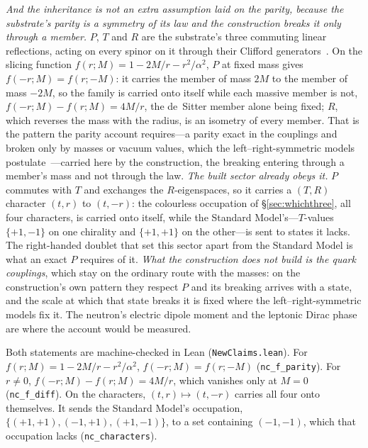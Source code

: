 \documentclass[11pt]{article}
\begin{document}
\emph{And the inheritance is not an extra assumption laid on the parity, because the substrate's parity is a symmetry of its law and the construction breaks it only through a member.} $P$, $T$ and $R$ are the substrate's three commuting linear reflections, acting on every spinor on it through their Clifford generators~\cite{JanzenBoundary}. On the slicing function $f(r;M)=1-2M/r-r^{2}/\alpha^{2}$, $P$ at fixed mass gives $f(-r;M)=f(r;-M)$: it carries the member of mass $2M$ to the member of mass $-2M$, so the family is carried onto itself while each massive member is not, $f(-r;M)-f(r;M)=4M/r$, the de~Sitter member alone being fixed; $R$, which reverses the mass with the radius, is an isometry of every member. That is the pattern the parity account requires---a parity exact in the couplings and broken only by masses or vacuum values, which the left--right-symmetric models postulate~\cite{BabuMohapatra1990,HallHarigaya2018}---carried here by the construction, the breaking entering through a member's mass and not through the law. \emph{The built sector already obeys it.} $P$ commutes with $T$ and exchanges the $R$-eigenspaces, so it carries a $(T,R)$ character $(t,r)$ to $(t,-r)$: the colourless occupation of \S\ref{sec:whichthree}, all four characters, is carried onto itself, while the Standard Model's---$T$-values $\{+1,-1\}$ on one chirality and $\{+1,+1\}$ on the other---is sent to states it lacks. The right-handed doublet that set this sector apart from the Standard Model is what an exact $P$ requires of it. \emph{What the construction does not build is the quark couplings}, which stay on the ordinary route with the masses: on the construction's own pattern they respect $P$ and its breaking arrives with a state, and the scale at which that state breaks it is fixed where the left--right-symmetric models fix it. The neutron's electric dipole moment and the leptonic Dirac phase are where the account would be measured.

Both statements are machine-checked in Lean (\texttt{NewClaims.lean}). For $f(r;M)=1-2M/r-r^{2}/\alpha^{2}$, $f(-r;M)=f(r;-M)$ (\texttt{nc\_f\_parity}). For $r\ne0$, $f(-r;M)-f(r;M)=4M/r$, which vanishes only at $M=0$ (\texttt{nc\_f\_diff}). On the characters, $(t,r)\mapsto(t,-r)$ carries all four onto themselves. It sends the Standard Model's occupation, $\{(+1,+1),(-1,+1),(+1,-1)\}$, to a set containing $(-1,-1)$, which that occupation lacks (\texttt{nc\_characters}).
\end{document}
